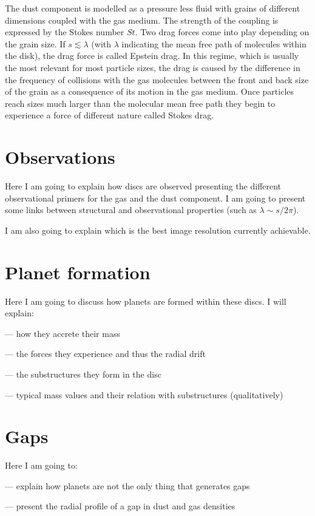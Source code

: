 \documentclass[a4paper,10pt]{report}
\begin{document}
The dust component is modelled as a pressure less fluid with grains of different dimensions coupled with the gas medium. The strength of the coupling is expressed by the Stokes number $St$.
Two drag forces come into play depending on the grain size. If $s \lesssim \lambda$ (with $\lambda$ indicating the mean free path of molecules within the disk), the drag force is called Epstein drag. 
In this regime, which is usually the most relevant for most particle sizes, the drag is caused by the difference in the frequency of 
collisions with the gas molecules between the front and back size of the grain as a consequence of its motion in the gas medium.
Once particles reach sizes much larger than the molecular mean free path they begin to experience a force of different nature called Stokes drag.




\section{Observations}
Here I am going to explain how discs are observed presenting the different observational primers 
for the gas and the dust component. I am going to present some links between structural and observational 
properties (such as $\lambda \sim s/2\pi$).

I am also going to explain which is the best image resolution currently achievable.

\section{Planet formation}
Here I am going to discuss how planets are formed within these discs. 
I will explain: 

    — how they accrete their mass

    — the forces they experience and thus the radial drift

    — the substructures they form in the disc

    — typical mass values and their relation with substructures (qualitatively) 

\section{Gaps}
Here I am going to:

— explain how planets are not the only thing that generates gaps

— present the radial profile of a gap in dust and gas densities
\end{document}
